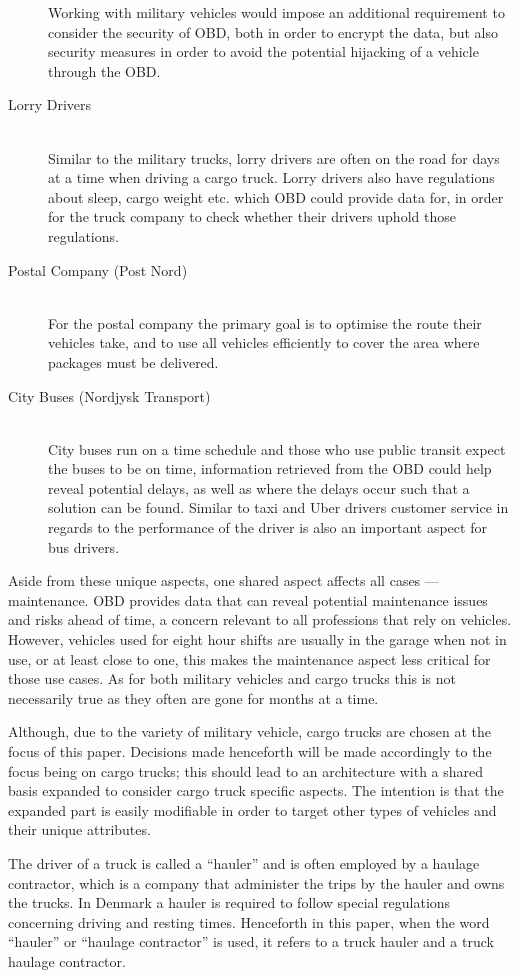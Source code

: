 \begin{description}
    Working with military vehicles would impose an additional requirement to consider the security of \ac{OBD}, both in order to encrypt the data, but also security measures in order to avoid the potential hijacking of a vehicle through the \ac{OBD}.
    \item [Lorry Drivers] \hfill \\
    Similar to the military trucks, lorry drivers are often on the road for days at a time when driving a cargo truck.
    Lorry drivers also have regulations about sleep, cargo weight etc. which \ac{OBD} could provide data for, in order for the truck company to check whether their drivers uphold those regulations.
    \item [Postal Company (Post Nord)] \hfill \\
    For the postal company the primary goal is to optimise the route their vehicles take, and to use all vehicles efficiently to cover the area where packages must be delivered.
    \item [City Buses (Nordjysk Transport)] \hfill \\
    City buses run on a time schedule and those who use public transit expect the buses to be on time, information retrieved from the \ac{OBD} could help reveal potential delays, as well as where the delays occur such that a solution can be found.
    Similar to taxi and Uber drivers customer service in regards to the performance of the driver is also an important aspect for bus drivers.
\end{description}

\bigskip
Aside from these unique aspects, one shared aspect affects all cases --- maintenance.
\ac{OBD} provides data that can reveal potential maintenance issues and risks ahead of time, a concern relevant to all professions that rely on vehicles.
However, vehicles used for eight hour shifts are usually in the garage when not in use, or at least close to one, this makes the maintenance aspect less critical for those use cases.
As for both military vehicles and cargo trucks this is not necessarily true as they often are gone for months at a time.

Although, due to the variety of military vehicle, cargo trucks are chosen at the focus of this paper.
Decisions made henceforth will be made accordingly to the focus being on cargo trucks; this should lead to an architecture with a shared basis expanded to consider cargo truck specific aspects.
The intention is that the expanded part is easily modifiable in order to target other types of vehicles and their unique attributes.

The driver of a truck is called a ``hauler'' and is often employed by a haulage contractor, which is a company that administer the trips by the hauler and owns the trucks.
In Denmark a hauler is required to follow special regulations concerning driving and resting times\cite{haulierSleepLaw}.
Henceforth in this paper, when the word ``hauler'' or ``haulage contractor'' is used, it refers to a truck hauler and a truck haulage contractor. 
